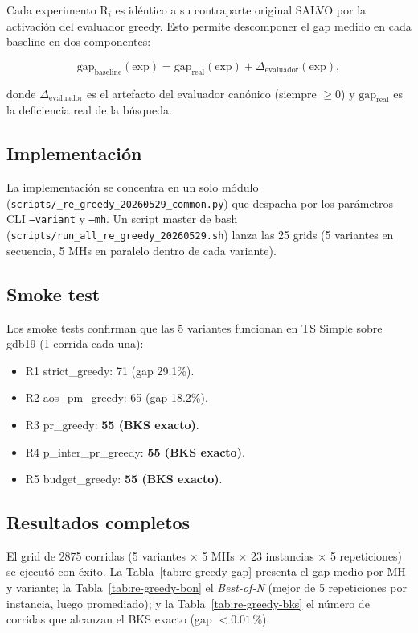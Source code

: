\documentclass[11pt,a4paper]{article}
\theoremstyle{definition}
\theoremstyle{remark}
\newcommand{\gap}{\text{gap}}
\begin{document}
Cada experimento R$_i$ es idéntico a su contraparte original SALVO por
la activación del evaluador greedy. Esto permite descomponer el gap
medido en cada baseline en dos componentes:

\begin{equation}
\gap_{\text{baseline}}(\text{exp}) = \gap_{\text{real}}(\text{exp}) +
\Delta_{\text{evaluador}}(\text{exp}),
\end{equation}

donde $\Delta_{\text{evaluador}}$ es el artefacto del evaluador
canónico (siempre $\ge 0$) y $\gap_{\text{real}}$ es la deficiencia
real de la búsqueda.

\subsection{Implementación}

La implementación se concentra en un solo módulo
(\texttt{scripts/\_re\_greedy\_20260529\_common.py}) que despacha por
los parámetros CLI \texttt{--variant} y \texttt{--mh}. Un script
master de bash (\texttt{scripts/run\_all\_re\_greedy\_20260529.sh})
lanza las 25 grids (5 variantes en secuencia, 5 MHs en paralelo dentro
de cada variante).

\subsection{Smoke test}

Los smoke tests confirman que las 5 variantes funcionan en TS Simple
sobre gdb19 (1 corrida cada una):

\begin{itemize}
\item R1 strict\_greedy: 71 (gap 29.1\%).
\item R2 aos\_pm\_greedy: 65 (gap 18.2\%).
\item R3 pr\_greedy: \textbf{55 (BKS exacto)}.
\item R4 p\_inter\_pr\_greedy: \textbf{55 (BKS exacto)}.
\item R5 budget\_greedy: \textbf{55 (BKS exacto)}.
\end{itemize}

\subsection{Resultados completos}

El grid de 2875 corridas (5 variantes $\times$ 5 MHs $\times$ 23 instancias
$\times$ 5 repeticiones) se ejecutó con éxito. La
Tabla~\ref{tab:re-greedy-gap} presenta el gap medio por MH y variante;
la Tabla~\ref{tab:re-greedy-bon} el \emph{Best-of-N} (mejor de 5
repeticiones por instancia, luego promediado); y la
Tabla~\ref{tab:re-greedy-bks} el número de corridas que alcanzan el BKS
exacto (gap $< 0.01$\,\%).
\end{document}

